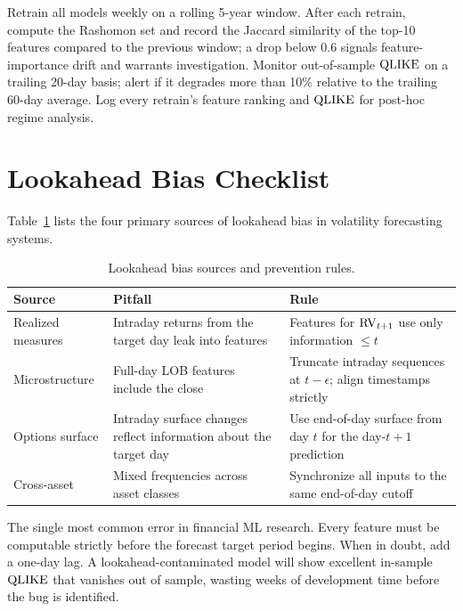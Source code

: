Retrain all models weekly on a rolling 5-year window.
After each retrain, compute the Rashomon set and record the Jaccard similarity of the top-10 features compared to the previous window; a drop below 0.6 signals feature-importance drift and warrants investigation.
Monitor out-of-sample $\operatorname{QLIKE}$ on a trailing 20-day basis; alert if it degrades more than 10\% relative to the trailing 60-day average.
Log every retrain's feature ranking and $\operatorname{QLIKE}$ for post-hoc regime analysis.


\section{Lookahead Bias Checklist}
\label{sec:lookahead}

Table~\ref{tab:lookahead} lists the four primary sources of lookahead bias in volatility forecasting systems.

\begin{table}[htbp]
\centering
\caption{Lookahead bias sources and prevention rules.}
\label{tab:lookahead}
\small
\begin{tabular}{@{}lp{4.0cm}p{5.2cm}@{}}
\toprule
\textbf{Source} & \textbf{Pitfall} & \textbf{Rule} \\
\midrule
Realized measures & Intraday returns from the target day leak into features & Features for $\operatorname{RV}_{t+1}$ use only information $\leq t$ \\
Microstructure    & Full-day LOB features include the close & Truncate intraday sequences at $t-\epsilon$; align timestamps strictly \\
Options surface   & Intraday surface changes reflect information about the target day & Use end-of-day surface from day $t$ for the day-$t{+}1$ prediction \\
Cross-asset       & Mixed frequencies across asset classes & Synchronize all inputs to the same end-of-day cutoff \\
\bottomrule
\end{tabular}
\end{table}

\begin{warning}
The single most common error in financial ML research.
Every feature must be computable strictly before the forecast target period begins.
When in doubt, add a one-day lag.
A lookahead-contaminated model will show excellent in-sample $\operatorname{QLIKE}$ that vanishes out of sample, wasting weeks of development time before the bug is identified.
\end{warning}
